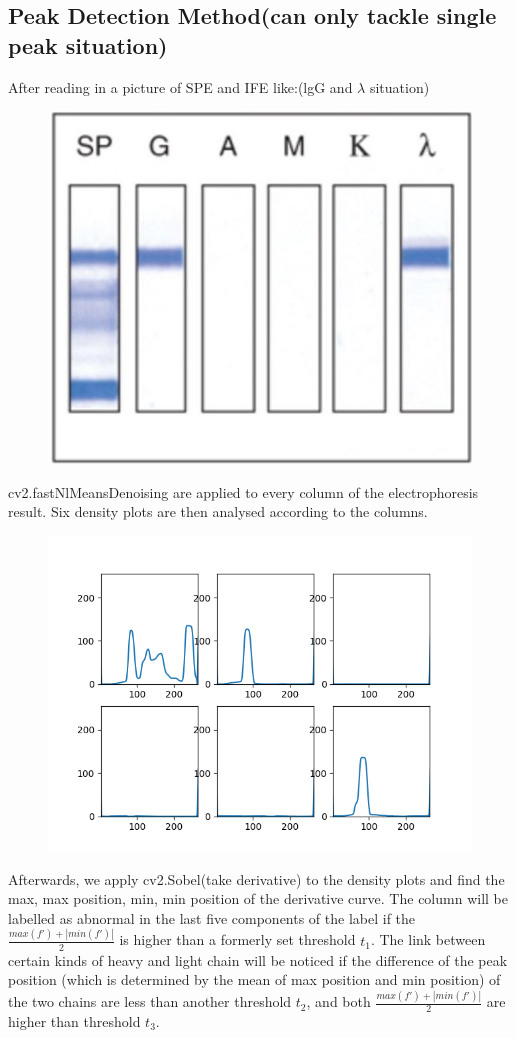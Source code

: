 \documentclass[12pt]{ctexart}
\begin{document}
\subsection{Peak Detection Method(can only tackle single peak situation)}
\par After reading in a picture of SPE and IFE like:(lgG and $\lambda$ situation)
\begin{figure}[H]
    \centering
    \includegraphics[width=0.5\linewidth]{gl.jpg}
\end{figure}
cv2.fastNlMeansDenoising are applied to every column of the electrophoresis result. Six density plots are then analysed according to the columns.
\begin{figure}[H]
    \centering
    \includegraphics[width=0.5\linewidth]{lgG-lambda.png}
\end{figure}
Afterwards, we apply cv2.Sobel(take derivative) to the density plots and find the max, max position, min, min position of the derivative curve. The column will be labelled as abnormal in the last five components of the label if the $\frac{max(f')+|min(f')|}{2}$ is higher than a formerly set threshold $t_1$. The link between certain kinds of heavy and light chain will be noticed if the difference of the peak position (which is determined by the mean of max position and min position) of the two chains are less than another threshold $t_2$, and both $\frac{max(f')+|min(f')|}{2}$ are higher than threshold $t_3$.
\end{document}
